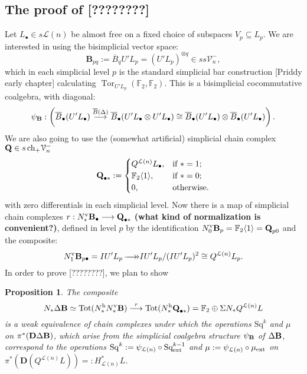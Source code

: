 \documentclass[11pt]{amsart}
\theoremstyle{plain}
\newtheorem{prop}[thm]{Proposition}
\theoremstyle{definition}
\DeclareMathOperator{\Tor}{Tor}
\renewcommand{\to}{\longrightarrow}
\newcommand{\calL}{\mathcal{L}}
\newcommand{\calV}{\mathcal{V}}
\theoremstyle{plain}
\newcommand{\vect}[2]{\calV^{#1}_{#2}}
\newcommand{\ExtCohOp}{\textup{Sq}_\textup{ext}}
\newcommand{\ExtCohProd}{\mu_\textup{ext}}
\newcommand{\epi}{{\,\makebox[0cm][l]{\ensuremath\to}\to}}
\newcommand{\UEA}{U'}%
\newcommand{\Sq}{\mathrm{Sq}}
\newcommand{\F}{\mathbb{F}}
\newcommand{\complexes}{\textup{ch}_+}
\newcommand{\Ftwo}{\F_2}
\newcommand{\dual}{\mathbf{D}}
\begin{document}
\begin{appendices}
\subsection{The proof of [????????]}

Let $ L_\bullet\in s\calL(n)$ be almost free on a fixed choice of subspaces $V_p\subseteq  L_p$.
We are interested in using the bisimplicial vector space:
\[\textbf{B}_{pq}:=\overline{B}_q \UEA L_p=(\UEA L_p)^{\otimes q}\in ss\vect{-}{n},\]
which in each simplicial level $p$ is the standard simplicial bar construction [Priddy early chapter] calculating $\Tor_{\UEA L_p}(\Ftwo ,\Ftwo )$.
This is a bisimplicial cocommutative coalgebra, with diagonal:
\[\psi_{\textup{\textbf{B}}}:\left(\overline{B}_\bullet (\UEA L_\bullet)\overset{\overline{B}(\Delta)}{\to}\overline{B}_\bullet (\UEA L_\bullet\otimes \UEA L_\bullet)\cong\overline{B}_\bullet (\UEA L_\bullet)\otimes \overline{B}_\bullet (\UEA L_\bullet)\right).\]
We are also going to use the (somewhat artificial) simplicial chain complex $\textbf{Q}\in s\,\complexes\vect{-}{n}$
\[\textbf{Q}_{\bullet *}:=\begin{cases}
Q^{\calL(n)} L_\bullet,&\textup{if }*=1;\\
\Ftwo \langle 1\rangle,&\textup{if }*=0;
\\0,&\textup{otherwise.}
\end{cases}
\]
with zero differentials in each simplicial level. Now there is a map of simplicial chain complexes $r:N_*^\textup{v}\textbf{B}_\bullet\to \textbf{Q}_{\bullet*}$ \textbf{(what kind of normalization is convenient?)}, defined in level $p$ by the identification $N^\textup{v}_0\textbf{B}_p=\Ftwo \langle 1\rangle=\textbf{Q}_{p0}$ and the composite:
\[N^\textup{v}_1\textbf{B}_{p\bullet}=I\UEA L_p\epi I\UEA L_p/(I\UEA L_p)^2\cong Q^{\calL(n)} L_p.\]
In order to prove [????????], we plan to show
\begin{prop}\label{the point of the appendix} The composite
\[N_*\Delta\textbf{\textup{B}}\simeq\textup{Tot}(N^\textup{h}_*N^\textup{v}_*\textbf{\textup{B}})\overset{r}{\to} \textup{Tot}(N^\textup{h}_*\textbf{\textup{Q}}_{\bullet*})=\Ftwo \oplus \Sigma N_*Q^{\calL(n)} L\]
is a weak equivalence of chain complexes under which the operations $\Sq^k$ and $\mu$ on $\pi^*(\dual\Delta\textup{\textbf{B}})$, which arise from the simplicial coalgebra structure $\psi_{\textup{\textbf{B}}}$ of $\Delta \textup{\textbf{B}}$, correspond to the operations $\Sq^k:=\psi_{\calL(n)}\circ\ExtCohOp^{k-1}$ and $\mu:=\psi_{\calL(n)}\circ\ExtCohProd$ on $\pi^*(\dual(Q^{\calL(n)} L))=:H^*_{\calL(n)} L$.
\end{prop}


\end{appendices}
\end{document}
